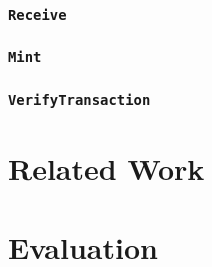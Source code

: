 \documentclass{article}
\begin{document}
\subsubsection{\texttt{Receive}}
\subsubsection{\texttt{Mint}}
\subsubsection{\texttt{VerifyTransaction}}

\section{Related Work}
\section{Evaluation}

\printbibliography
\end{document}
